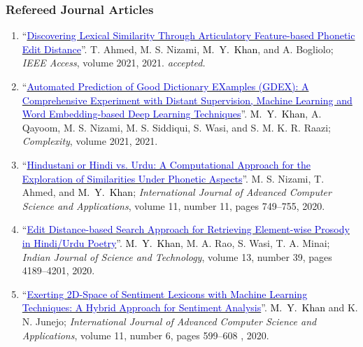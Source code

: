 \documentclass[a4paper, 10pt]{article}
\begin{document}
\subsubsection*{{ Refereed Journal Articles}}
\begin{enumerate}
\itemsep-4pt

\item ``\href{https://arxiv.org/abs/2008.06865}{\textcolor{MediumBlue}{Discovering Lexical Similarity Through Articulatory Feature-based Phonetic Edit Distance}}''. T. Ahmed, M. S. Nizami, \textcolor{Black}{M.~Y.~Khan}, and A. Bogliolo; \emph{IEEE Access}, volume 2021, 2021. \qonetag{\textcolor{white}{\textsf\bfseries Q1}}   {\small\it accepted.}

\item ``\href{https://doi.org/10.1155/2021/2553199}{\textcolor{MediumBlue}{Automated Prediction of Good Dictionary EXamples (GDEX): A Comprehensive Experiment with Distant Supervision, Machine Learning and Word Embedding-based Deep Learning Techniques}}''. \textcolor{Black}{M.~Y.~Khan}, A. Qayoom, M. S. Nizami, M. S. Siddiqui, S. Wasi, and S. M. K. R. Raazi; \emph{Complexity}, volume 2021, 2021. \qonetag{\textcolor{white}{\textsf\bfseries Q1}}  

\item ``\href{https://dx.doi.org/10.14569/IJACSA.2020.0111191}{\textcolor{MediumBlue}{Hindustani or Hindi vs. Urdu: A Computational Approach for the Exploration of Similarities Under Phonetic Aspects}}''. M. S. Nizami, T. Ahmed, and \textcolor{Black}{M.~Y.~Khan}; \emph{International Journal of Advanced Computer Science and Applications}, volume 11, number 11, pages 749--755, 2020. \qthreetag{\textcolor{white}{\textsf\bfseries Q3}} 

\item ``\href{https://doi.org/10.17485/IJST/v13i39.1489}{\textcolor{MediumBlue}{Edit Distance-based Search Approach for Retrieving Element-wise Prosody in Hindi/Urdu Poetry}}''. \textcolor{Black}{M.~Y.~Khan}, M. A. Rao, S. Wasi, T. A. Minai; \emph{Indian Journal of Science and Technology}, volume 13, number 39, pages 4189--4201, 2020. 

\item ``\href{https://doi.org/10.14569/IJACSA.2020.0110672}{\textcolor{MediumBlue}{Exerting 2D-Space of Sentiment Lexicons with Machine Learning Techniques: A Hybrid Approach for Sentiment Analysis}}''. \textcolor{Black}{M.~Y.~Khan} and K. N. Junejo; \emph{International Journal of Advanced Computer Science and Applications}, volume 11, number 6, pages 599--608
, 2020. \qthreetag{\textcolor{white}{\textsf\bfseries Q3}} 


\end{enumerate}
\end{document}
